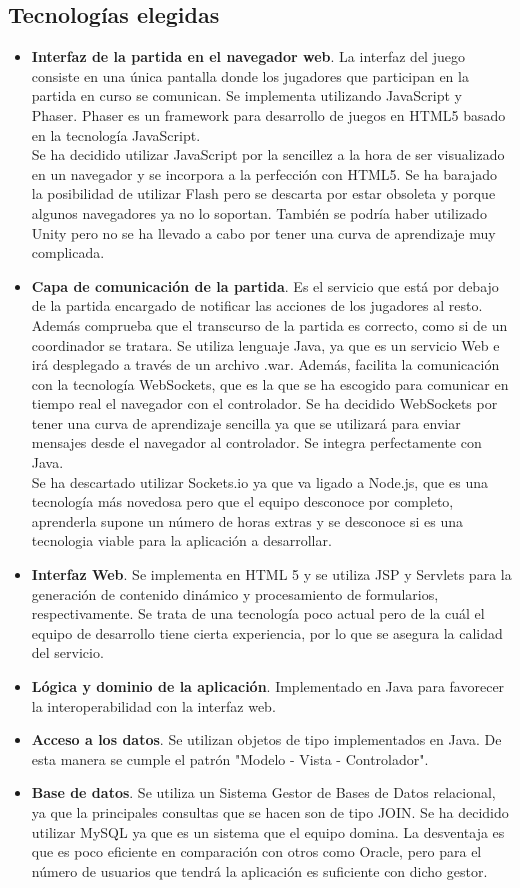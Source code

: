 \subsection{Tecnologías elegidas}
\begin{itemize}
\item \textbf{Interfaz de la partida en el navegador web}. La interfaz del juego consiste en una única pantalla donde los jugadores que participan en la partida en curso se comunican. Se implementa utilizando JavaScript y Phaser. Phaser es un framework para desarrollo de juegos en HTML5 basado en la tecnología JavaScript.  \\ Se ha decidido utilizar JavaScript por la sencillez a la hora de ser visualizado en un navegador y se incorpora a la perfección con HTML5. Se ha barajado la posibilidad de utilizar Flash pero se descarta por estar obsoleta y porque algunos navegadores ya no lo soportan. También se podría haber utilizado Unity pero no se ha llevado a cabo por tener una curva de aprendizaje muy complicada.
\item \textbf{Capa de comunicación de la partida}. Es el servicio que está por debajo de la partida encargado de notificar las acciones de los jugadores al resto. Además comprueba que el transcurso de la partida es correcto, como si de un coordinador se tratara. Se utiliza lenguaje Java, ya que es un servicio Web e irá desplegado a través de un archivo .war. Además, facilita la comunicación con la tecnología WebSockets, que es la que se ha escogido para comunicar en tiempo real el navegador con el controlador. Se ha decidido WebSockets por tener una curva de aprendizaje sencilla ya que se utilizará para enviar mensajes desde el navegador al controlador. Se integra perfectamente con Java. \\
Se ha descartado utilizar Sockets.io ya que va ligado a Node.js, que es una tecnología más novedosa pero que el equipo desconoce por completo, aprenderla supone un número de horas extras y se desconoce si es una tecnologia viable para la aplicación a desarrollar.
\item \textbf{Interfaz Web}. Se implementa en HTML 5 y se utiliza  JSP y Servlets para la generación de contenido dinámico y procesamiento de formularios, respectivamente. Se trata de una tecnología poco actual pero de la cuál el equipo de desarrollo tiene cierta experiencia, por lo que se asegura la calidad del servicio.
\item \textbf{Lógica y dominio de la aplicación}. Implementado en Java para favorecer la interoperabilidad con la interfaz web.
\item \textbf{Acceso a los datos}. Se utilizan objetos de tipo implementados en Java. De esta manera se cumple el patrón "Modelo - Vista - Controlador".
\item \textbf{Base de datos}. Se utiliza un Sistema Gestor de Bases de Datos relacional, ya que la principales consultas que se hacen son de tipo JOIN. Se ha decidido utilizar MySQL ya que es un sistema que el equipo domina. La desventaja es que es poco eficiente en comparación con otros como Oracle, pero para el número de usuarios que tendrá la aplicación es suficiente con dicho gestor.
\end{itemize}

